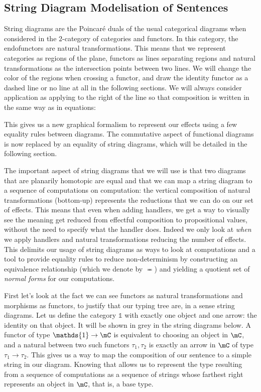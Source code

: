 \documentclass[math, english, info]{cours}
\begin{document}
\subsection{String Diagram Modelisation of Sentences}
\label{subsec:sd}
String diagrams are the Poincaré duals of the usual categorical diagrams when considered in the $2$-category of categories and functors.
In this category, the endofunctors are natural transformations.
This means that we represent categories as regions of the plane, functors as lines separating regions and natural transformations as the intersection points between two lines.
We will change the color of the regions when crossing a functor, and draw the identity functor as a dashed line or no line at all in the following sections.
We will always consider application as applying to the right of the line so that composition is written in the same way as in equations:
\begin{center}
\end{center}
This gives us a new graphical formalism to represent our effects using a few equality rules between diagrams.
The commutative aspect of functional diagrams is now replaced by an equality of string diagrams, which will be detailed in the following section.

The important aspect of string diagrams that we will use is that two diagrams that are planarily homotopic are equal \cite{delpeuchNormalizationPlanarString2022} and that we can map a string diagram to a sequence of computations on computation: the vertical composition of natural transformations (bottom-up) represents the reductions that we can do on our set of effects.
This means that even when adding handlers, we get a way to visually see the meaning get reduced from effectful composition to propositional values, without the need to specify what the handler does.
Indeed we only look at \emph{when} we apply handlers and natural transformations reducing the number of effects.
This delimits our usage of string diagrams as ways to look at computations and a tool to provide equality rules to reduce non-determinism by constructing an equivalence relationship (which we denote by $\eqcirc$) and yielding a quotient set of \emph{normal forms} for our computations.

\medskip

First let's look at the fact we can see functors as natural transformations and morphisms as functors, to justify that our typing tree are, in a sense string diagrams.
Let us define the category $\mathds{1}$ with exactly one object and one arrow: the identity on that object. It will be shown in grey in the string diagrams below.
A functor of type $\mathds{1} \to \mC$ is equivalent to choosing an object in $\mC$, and a natural between two such functors $\tau_{1}, \tau_{2}$ is exactly an arrow in $\mC$ of type $\tau_{1} \to \tau_{2}$.
This gives us a way to map the composition of our sentence to a simple string in our diagram.
Knowing that allows us to represent the type resulting from a sequence of computations as a sequence of strings whose farthest right represents an object in $\mC$, that is, a base type.
\begin{center}
\end{center}
\end{document}
